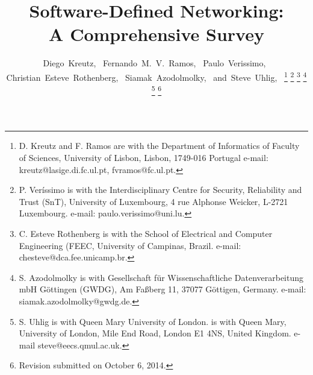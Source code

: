 \documentclass[journal]{IEEEtran}
\begin{document}
%

%
\title{Software-Defined Networking: \\A Comprehensive Survey}


%
%
%

\author{Diego~Kreutz,~
        Fernando~M.~V.~Ramos,~
        Paulo~Verissimo,~
        Christian~Esteve~Rothenberg,~        
        Siamak~Azodolmolky,~        
        and~Steve~Uhlig,~%
\thanks{D. Kreutz and F. Ramos are with the Department of Informatics of Faculty of Sciences, University of Lisbon, Lisbon,
	1749-016 Portugal e-mail: kreutz@lasige.di.fc.ul.pt, fvramos@fc.ul.pt.}
\thanks{P. Ver\'{i}ssimo is with the Interdisciplinary Centre for Security, Reliability and Trust (SnT), University of Luxembourg,
	4 rue Alphonse Weicker,  L-2721 Luxembourg. e-mail: paulo.verissimo@uni.lu.}    
\thanks{C. Esteve Rothenberg is with the School of Electrical and Computer Engineering (FEEC, University of Campinas, Brazil. e-mail: chesteve@dca.fee.unicamp.br.}
\thanks{S. Azodolmolky is with Gesellschaft f\"{u}r Wissenschaftliche Datenverarbeitung mbH G\"{o}ttingen (GWDG), Am Fa{\ss}berg 11, 37077 G\"{o}ttigen, Germany. e-mail: siamak.azodolmolky@gwdg.de.}
\thanks{S. Uhlig is with Queen Mary University of London. is with Queen Mary, University of London, Mile End Road, London E1 4NS, United Kingdom. e-mail steve@eecs.qmul.ac.uk.}%
\thanks{Revision submitted on October 6, 2014.}}
\end{document}
